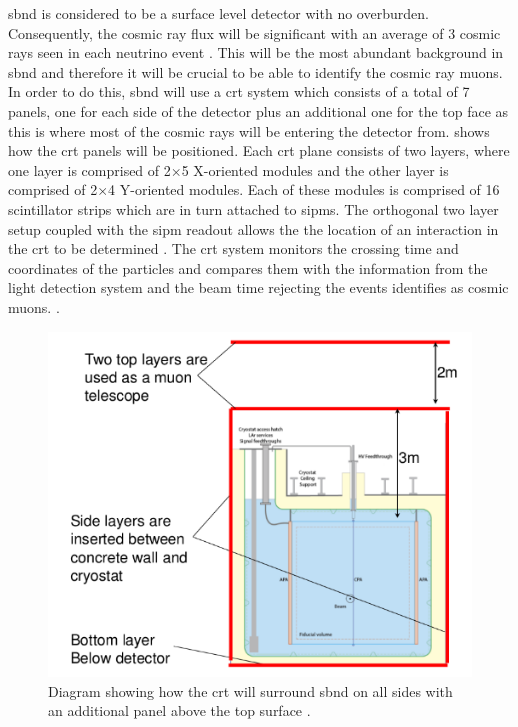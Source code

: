 \gls{sbnd} is considered to be a surface level detector with no overburden. Consequently, the cosmic ray flux will be significant with an average of 3 cosmic rays seen in each neutrino event \cite{SBN_Proposal}. This will be the most abundant background in \gls{sbnd} and therefore it will be crucial to be able to identify the cosmic ray muons. In order to do this, \gls{sbnd} will use a \gls{crt} system which consists of a total of 7 panels, one for each side of the detector plus an additional one for the top face as this is where most of the cosmic rays will be entering the detector from.  shows how the \gls{crt} panels will be positioned. Each \gls{crt} plane consists of two layers, where one layer is comprised of 2$\times$5 X-oriented modules and the other layer is comprised of 2$\times$4 Y-oriented modules. Each of these modules is comprised of 16 scintillator strips which are in turn attached to \glspl{sipm}. The orthogonal two layer setup coupled with the \gls{sipm} readout allows the the location of an interaction in the \gls{crt} to be determined \cite{sbnd_crt}. The \gls{crt} system monitors the crossing time and coordinates of the particles and compares them with the information from the light detection system and the beam time rejecting the events identifies as cosmic muons. \cite{microboone_crt}.

\begin{figure}[!h]
    \centering
    \includegraphics[width = \largefigwidth]{figures-chap3/SBND_CRT.png}
    \caption[CRT positioning in SBND.]{Diagram showing how the \gls{crt} will surround \gls{sbnd} on all sides with an additional panel above the top surface \cite{SBN_Proposal}.}
    \label{fig:sbnd_crt}
\end{figure}

